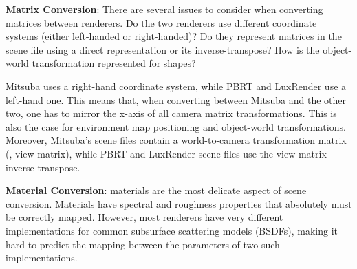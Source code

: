 \textbf{Matrix Conversion}: 
There are several issues to consider when converting matrices between renderers.
Do the two renderers use different coordinate systems (either left-handed or right-handed)? 
Do they represent matrices in the scene file using a direct representation or its
inverse-transpose? How is the object-world transformation represented for
shapes?

Mitsuba uses a right-hand coordinate system, while PBRT and LuxRender use a
left-hand one. This means that, when converting between Mitsuba and the other
two, one has to mirror the x-axis of all camera matrix transformations. This is
also the case for environment map positioning and object-world
transformations. Moreover, Mitsuba's scene files contain a world-to-camera transformation matrix (\ie, view matrix),
while PBRT and LuxRender scene files use the view matrix inverse transpose.



\textbf{Material Conversion}: 
materials are the most delicate aspect of scene conversion. Materials have
spectral and roughness properties that absolutely must be correctly mapped. 
However, most renderers have very different implementations
for common subsurface scattering models (BSDFs), making it hard to
predict the mapping between the parameters of two such implementations.

